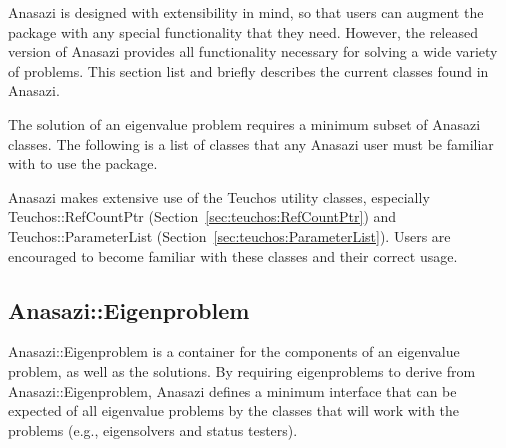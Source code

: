 Anasazi is designed with extensibility in mind, so that users can augment the package with
any special functionality that they need. However, the released version of Anasazi
provides all functionality necessary for solving a wide variety of problems. This section
list and briefly describes the current classes found in Anasazi.

The solution of an eigenvalue problem requires a minimum subset of Anasazi classes. The
following is a list of classes that any Anasazi user must be familiar with to use the
package.

\begin{remark}
Anasazi makes extensive use of the Teuchos utility classes, especially
Teuchos::RefCountPtr (Section~\ref{sec:teuchos:RefCountPtr}) and
Teuchos::ParameterList (Section~\ref{sec:teuchos:ParameterList}). Users
are encouraged to become familiar with these classes and their correct
usage.
\end{remark}

\subsection{Anasazi::Eigenproblem}
\label{sec:anasazi:eigenproblem}

Anasazi::Eigenproblem is a container for the components of an eigenvalue problem, as well
as the solutions. By requiring eigenproblems to derive from Anasazi::Eigenproblem, Anasazi
defines a minimum interface that can be expected of all eigenvalue problems by the classes
that will work with the problems (e.g., eigensolvers and status testers).


